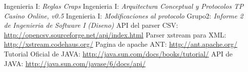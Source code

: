 
\begin{thebibliography}{20}

 Ingenieria I: \emph{Reglas Craps}
 Ingenieria I: \emph{Arquitectura Conceptual y Protocolos TP Casino Online, v0.5}
 Ingenieria I: \emph{Modificaciones al protocolo}
 Grupo2: \emph{Informe 2 de Ingenieria de Software I (Diseno)}
 API del parser CSV: \url{http://opencsv.sourceforge.net/api/index.html}
 Parser xstream para XML: \url{http://xstream.codehaus.org/}
 Pagina de apache ANT: \url{http://ant.apache.org/}
 Tutorial Oficial de JAVA: \url{http://java.sun.com/docs/books/tutorial/}
 API de JAVA: \url{http://java.sun.com/javase/6/docs/api/}
\end{thebibliography}